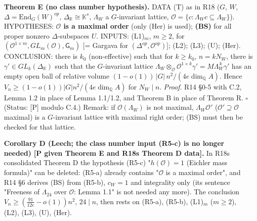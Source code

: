 \textbf{Theorem E\textquotesingle{} (no class number hypothesis).} DATA (T) as in R18 (\(G\), \(W\), \(\Delta=\mathrm{End}_G(W)^{op}\), \(\Delta_{\mathbb R}\cong\mathbb K^s\), \(\Lambda_W\) a \(G\)-invariant lattice, \(\mathcal O=\{c:\Lambda_Wc\subseteq\Lambda_W\}\)). HYPOTHESES: \textbf{\(\mathcal O\) is a maximal order} (only (Her) is used); \textbf{(BS)} for all proper nonzero \(\Delta\)-subspaces \(U\). INPUTS: (L1)\(_m\), \(m\ge2\), for \((\mathcal O^{1\times m},GL_m(\mathcal O),\mathsf G_m)\) {[}= Gargava for \((\Delta^{op},\mathcal O^{op})\){]}; (L2); (L3); (U); (Her). CONCLUSION: there is \(k_0\) (non-effective) such that for \(k\ge k_0\), \(n=kN_W\), there is \(\gamma'\in GL_k(\Delta_{\mathbb R})\) such that the \(G\)-invariant lattice \(\Lambda_W\otimes_{\mathcal O}\mathcal O^{1\times k}\gamma'=M\Lambda_W^{\,k}\gamma'\) has an empty open ball of relative volume \((1-o(1))\,|G|\,n^2/(4e\dim_{\mathbb Q}A)\). Hence \(V_n\ge(1-o(1))|G|n^2/(4e\dim_{\mathbb Q}A)\) for \(N_W\mid n\).
\emph{Proof.} R14 §0-5 with C.2, Lemma 1.2\textquotesingle{} in place of Lemma 1.1/1.2, and Theorem B in place of Theorem R. \(\square\) (Status: {[}P{]} modulo C.4.)
Remark: if \(\mathcal O(\Lambda_W)\) is not maximal, \(\Lambda_W\mathcal O'\) (\(\mathcal O'\supseteq\mathcal O\) maximal) is a \(G\)-invariant lattice with maximal right order; (BS) must then be checked for that lattice.

\textbf{Corollary D\textquotesingle{} (Leech; the class number input (R5-c) is no longer needed) {[}P given Theorem E\textquotesingle{} and R18\textquotesingle s Theorem D data{]}.} In R18\textquotesingle s consolidated Theorem D the hypothesis (R5-c) "\(h(\mathcal O)=1\) (Eichler mass formula)" can be deleted: (R5-a) already contains "\(\mathcal O\) is a maximal order", and R14 §6 derives (BS) from (R5-b), \(c_W=1\) and integrality only (its sentence "Freeness of \(\Lambda_{24}\) over \(\mathcal O\): Lemma 1.1" is not needed any more). The conclusion \(V_n\ge(\frac{91}{12e}-o(1))n^2\), \(24\mid n\), then rests on (R5-a), (R5-b), (L1)\(_m\) (\(m\ge2\)), (L2), (L3), (U), (Her).

